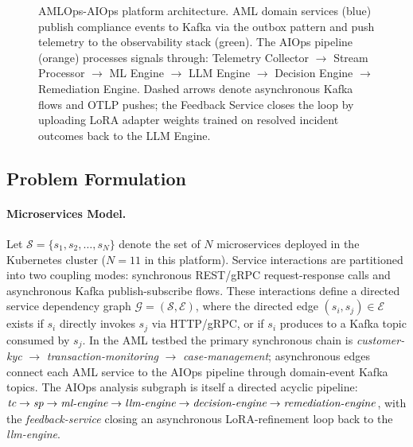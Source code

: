 \documentclass[a4paper,anonymous,UKenglish]{lipics-v2021}
\begin{document}
\begin{figure}[t]
{%
}
\caption{AMLOps-AIOps platform architecture. AML domain services (blue) publish
compliance events to Kafka via the outbox pattern and push telemetry to the
observability stack (green). The AIOps pipeline (orange) processes signals
through: Telemetry Collector $\to$ Stream Processor $\to$ ML Engine $\to$ LLM
Engine $\to$ Decision Engine $\to$ Remediation Engine. Dashed arrows denote
asynchronous Kafka flows and OTLP pushes; the Feedback Service closes the loop
by uploading LoRA adapter weights trained on resolved incident outcomes back to
the LLM Engine.}
\label{fig:architecture}
\end{figure}

\subsection{Problem Formulation}

\paragraph*{Microservices Model.}
Let $\mathcal{S} = \{s_1, s_2, \ldots, s_N\}$ denote the set of $N$
microservices deployed in the Kubernetes cluster ($N{=}11$ in this platform).
Service interactions are partitioned into two coupling modes: synchronous
REST/gRPC request-response calls and asynchronous Kafka publish-subscribe flows.
These interactions define a directed service dependency graph
$\mathcal{G} = (\mathcal{S}, \mathcal{E})$, where the directed edge
$(s_i, s_j) \in \mathcal{E}$ exists if $s_i$ directly invokes $s_j$ via
HTTP/gRPC, or if $s_i$ produces to a Kafka topic consumed by $s_j$. In the AML
testbed the primary synchronous chain is \textit{customer-kyc} $\to$
\textit{transaction-monitoring} $\to$ \textit{case-management}; asynchronous
edges connect each AML service to the AIOps pipeline through domain-event Kafka
topics. The AIOps analysis subgraph is itself a directed acyclic pipeline:
$\textit{tc} \to \textit{sp} \to \textit{ml\text{-}engine} \to
\textit{llm\text{-}engine} \to \textit{decision\text{-}engine} \to
\textit{remediation\text{-}engine}$, with the \textit{feedback-service} closing
an asynchronous LoRA-refinement loop back to the \textit{llm-engine}.
\end{document}
